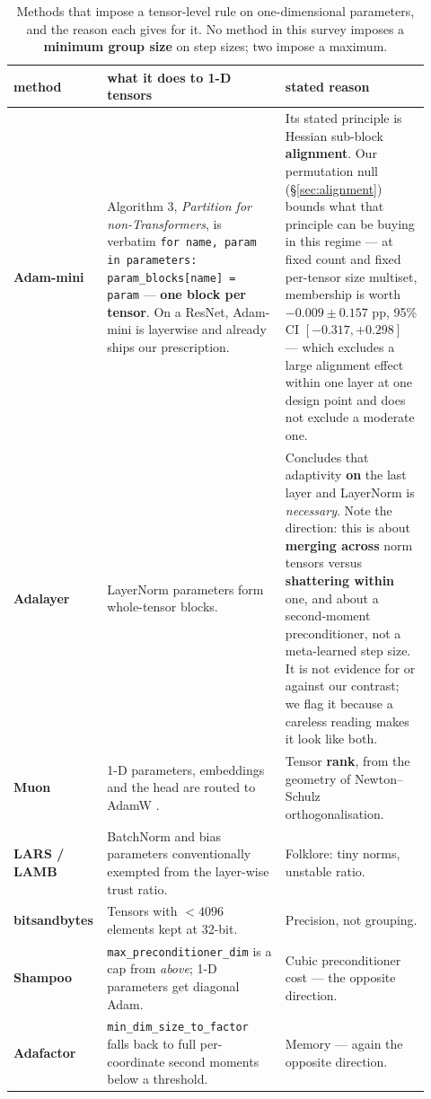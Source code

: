 \documentclass[10pt,letterpaper]{article}
\begin{document}
\begin{table}[htbp]
\centering
\small
\caption{Methods that impose a tensor-level rule on one-dimensional parameters, and the reason
each gives for it. No method in this survey imposes a \textbf{minimum group size} on step
sizes; two impose a maximum.}
\label{tab:tensor-rules}
\begin{tabular}{@{}p{0.16\linewidth}p{0.42\linewidth}p{0.34\linewidth}@{}}
\toprule
method & what it does to 1-D tensors & stated reason \\
\midrule
\textbf{Adam-mini} \citep{zhang2024adammini} &
Algorithm 3, \emph{Partition for non-Transformers}, is verbatim
\texttt{for name, param in parameters: param\_blocks[name] = param} --- \textbf{one block per
tensor}. On a ResNet, Adam-mini is layerwise and already ships our prescription. &
Its stated principle is Hessian sub-block \textbf{alignment}. Our permutation null
(\S\ref{sec:alignment}) bounds what that principle can be buying in this regime --- at fixed
count and fixed per-tensor size multiset, membership is worth $-0.009 \pm 0.157$ pp,
95\% CI $[-0.317, +0.298]$ --- which excludes a large alignment effect within one layer at one
design point and does not exclude a moderate one. \\
\textbf{Adalayer} \citep{zhao2024adalayer} &
LayerNorm parameters form whole-tensor blocks. &
Concludes that adaptivity \textbf{on} the last layer and LayerNorm is \emph{necessary}. Note
the direction: this is about \textbf{merging across} norm tensors versus \textbf{shattering
within} one, and about a second-moment preconditioner, not a meta-learned step size. It is not
evidence for or against our contrast; we flag it because a careless reading makes it look like
both. \\
\textbf{Muon} \citep{jordan2024muon,liu2025muon} &
1-D parameters, embeddings and the head are routed to AdamW
\citep{loshchilov2019adamw}. &
Tensor \textbf{rank}, from the geometry of Newton--Schulz orthogonalisation. \\
\textbf{LARS / LAMB} \citep{you2017lars,you2020lamb} &
BatchNorm \citep{ioffe2015batchnorm} and bias parameters conventionally exempted from the
layer-wise trust ratio. &
Folklore: tiny norms, unstable ratio. \\
\textbf{bitsandbytes} \citep{dettmers2022bitsandbytes} &
Tensors with $< 4096$ elements kept at 32-bit. &
Precision, not grouping. \\
\textbf{Shampoo} \citep{shi2023shampoo} &
\texttt{max\_preconditioner\_dim} is a cap from \emph{above}; 1-D parameters get diagonal
Adam. &
Cubic preconditioner cost --- the opposite direction. \\
\textbf{Adafactor} \citep{shazeer2018adafactor} &
\texttt{min\_dim\_size\_to\_factor} falls back to full per-coordinate second moments below a
threshold. &
Memory --- again the opposite direction. \\
\bottomrule
\end{tabular}
\end{table}
\end{document}
